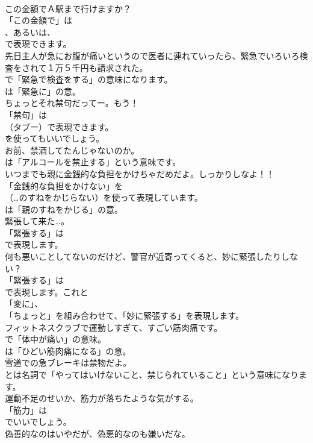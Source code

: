 \documentclass[8pt]{extreport}
\begin{document}
\begin{CJK}{UTF8}{min}
\\	この金額でＡ駅まで行けますか？ 
\\	「この金額で」は
\\	、あるいは、
\\	で表現できます。	
\\	先日主人が急にお腹が痛いというので医者に連れていったら、緊急でいろいろ検査をされて１万５千円も請求された。 
\\	で「緊急で検査をする」の意味になります。
\\	は「緊急に」の意。	
\\	ちょっとそれ禁句だってー。もう！ 
\\	「禁句」は 
\\	（タブー）で表現できます。
\\	を使ってもいいでしょう。	
\\	お前、禁酒してたんじゃないのか。 
\\	は「アルコールを禁止する」という意味です。	
\\	いつまでも親に金銭的な負担をかけちゃだめだよ。しっかりしなよ！！ 
\\	「金銭的な負担をかけない」を 
\\	（…のすねをかじらない）を使って表現しています。
\\	は「親のすねをかじる」の意。	
\\	緊張して来た…。 
\\	「緊張する」は
\\	で表現します。	
\\	何も悪いことしてないのだけど、警官が近寄ってくると、妙に緊張したりしない？ 
\\	「緊張する」は
\\	で表現します。これと
\\	「変に」、
\\	「ちょっと」を組み合わせて、「妙に緊張する」を表現します。	
\\	フィットネスクラブで運動しすぎて、すごい筋肉痛です。 
\\	で「体中が痛い」の意味。
\\	は「ひどい筋肉痛になる」の意。	
\\	雪道での急ブレーキは禁物だよ。 
\\	とは名詞で「やってはいけないこと、禁じられていること」という意味になります。	
\\	運動不足のせいか、筋力が落ちたような気がする。 
\\	「筋力」は
\\	でいいでしょう。	
\\	偽善的なのはいやだが、偽悪的なのも嫌いだな。 

\end{CJK}
\end{document}
